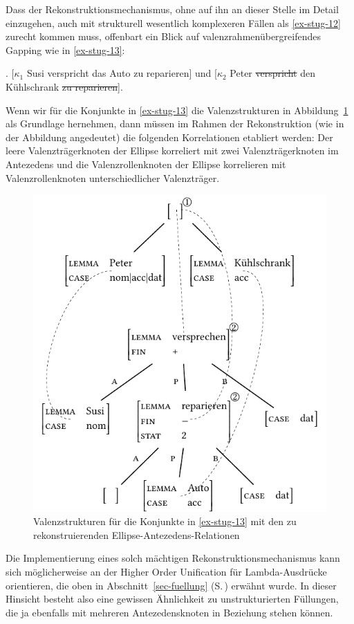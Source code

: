 Dass der Rekonstruktionsmechanismus, ohne auf ihn an dieser Stelle im Detail einzugehen, auch mit strukturell wesentlich komplexeren Fällen als \ref{ex-stug-12} zurecht kommen muss, offenbart ein Blick auf valenzrahmenübergreifendes Gapping wie in \ref{ex-stug-13}:

\ex. \label{ex-stug-13} [$\kappa_1$ Susi verspricht das Auto zu reparieren] und [$\kappa_2$ Peter \sout{verspricht} den Kühlschrank \sout{zu reparieren}].

Wenn wir für die Konjunkte in \ref{ex-stug-13} die Valenzstrukturen in Abbildung~\ref{fig-stug-17} als Grundlage hernehmen, dann müssen im Rahmen der Rekonstruktion (wie in der Abbildung angedeutet) die folgenden Korrelationen etabliert werden: Der leere Valenzträgerknoten der Ellipse korreliert mit zwei Valenzträgerknoten im Antezedens und die Valenzrollenknoten der Ellipse korrelieren mit Valenzrollenknoten unterschiedlicher Valenzträger.
\begin{figure}[t]
\centering
\includegraphics{graphics/abb917.pdf}
\caption{\label{fig-stug-17}Valenzstrukturen für die Konjunkte in \ref{ex-stug-13} mit den zu rekonstruierenden Ellipse-Antezedens-Relationen}
\end{figure}
Die Implementierung eines solch mächtigen Rekonstruktionsmechanismus kann sich möglicherweise an der Higher Order Unification für Lambda-Ausdrücke orientieren, die oben in Abschnitt~\ref{sec-fuellung} (S.\,\pageref{ex-fuellung-4}) erwähnt wurde. In dieser Hinsicht besteht also eine gewissen Ähnlichkeit zu unstrukturierten Füllungen, die ja ebenfalls mit mehreren Antezedensknoten in Beziehung stehen können. 


